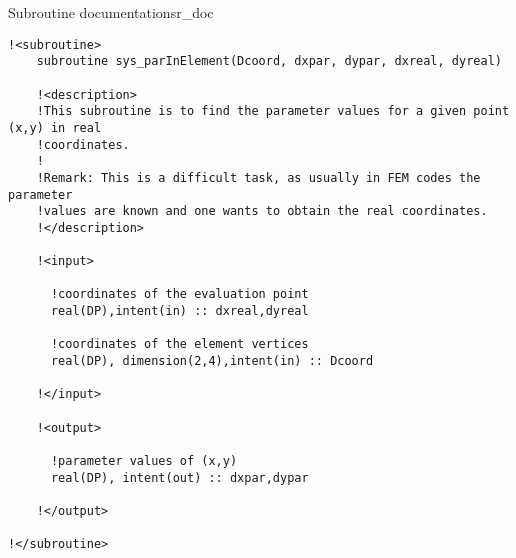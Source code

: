 \begin{code}{Subroutine documentation}{sr_doc}
\begin{verbatim}
!<subroutine>
    subroutine sys_parInElement(Dcoord, dxpar, dypar, dxreal, dyreal)

    !<description>
    !This subroutine is to find the parameter values for a given point (x,y) in real
    !coordinates.
    !
    !Remark: This is a difficult task, as usually in FEM codes the parameter 
    !values are known and one wants to obtain the real coordinates.
    !</description>

    !<input>

      !coordinates of the evaluation point
      real(DP),intent(in) :: dxreal,dyreal

      !coordinates of the element vertices
      real(DP), dimension(2,4),intent(in) :: Dcoord

    !</input>

    !<output>

      !parameter values of (x,y)
      real(DP), intent(out) :: dxpar,dypar

    !</output>

!</subroutine>

\end{verbatim}
\end{code}

